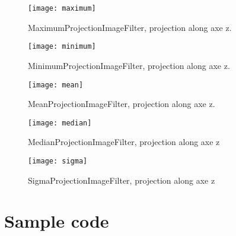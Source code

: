 \documentclass{InsightArticle}
\begin{document}
\begin{figure}[htbp]
\centering
\texttt{[image: maximum]}
\caption{MaximumProjectionImageFilter, projection along axe z.\label{maximum}}
\end{figure}

\begin{figure}[htbp]
\centering
\texttt{[image: minimum]}
\caption{MinimumProjectionImageFilter, projection along axe z.\label{minimum}}
\end{figure}

\begin{figure}[htbp]
\centering
\texttt{[image: mean]}
\caption{MeanProjectionImageFilter, projection along axe z.\label{mean}}
\end{figure}

\begin{figure}[htbp]
\centering
\texttt{[image: median]}
\caption{MedianProjectionImageFilter, projection along axe z\label{median}}
\end{figure}

\begin{figure}[htbp]
\centering
\texttt{[image: sigma]}
\caption{SigmaProjectionImageFilter, projection along axe z\label{median}}
\end{figure}

\section{Sample code}
\end{document}
